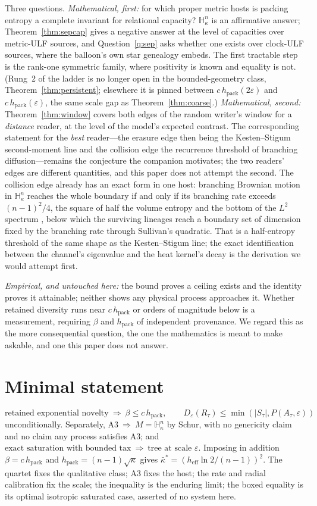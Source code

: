 \documentclass[11pt,reqno]{amsart}
\theoremstyle{plain}
\theoremstyle{definition}
\newcommand{\hpack}{h_{\mathrm{pack}}}
\newcommand{\heff}{h_{\mathrm{eff}}}
\newcommand{\Hk}{\mathbb{H}^n_\kappa}
\newcommand{\eps}{\varepsilon}
\begin{document}
Three questions. \emph{Mathematical, first:} for which proper metric hosts is packing entropy a complete invariant for relational capacity? $\Hk$ is an affirmative answer; Theorem~\ref{thm:sepcap} gives a negative answer at the level of capacities over metric-ULF sources, and Question~\ref{q:sep} asks whether one exists over clock-ULF sources, where the balloon's own star genealogy embeds. The first tractable step is the rank-one symmetric family, where positivity is known \cite{tessera2008,kerr2022} and equality is not. (Rung~2 of the ladder is no longer open in the bounded-geometry class, Theorem~\ref{thm:persistent}; elsewhere it is pinned between $c\,\hpack(2\eps)$ and $c\,\hpack(\eps)$, the same scale gap as Theorem~\ref{thm:coarse}.) \emph{Mathematical, second:} Theorem~\ref{thm:window} covers both edges of the random writer's window for a \emph{distance} reader, at the level of the model's expected contrast. The corresponding statement for the \emph{best} reader---the erasure edge then being the Kesten--Stigum second-moment line and the collision edge the recurrence threshold of branching diffusion---remains the conjecture the companion motivates; the two readers' edges are different quantities, and this paper does not attempt the second. The collision edge already has an exact form in one host: branching Brownian motion in $\Hk$ reaches the whole boundary if and only if its branching rate exceeds $(n-1)^2/4$, the square of half the volume entropy and the bottom of the $L^2$ spectrum \cite{lalleysellke1997,kps1998}, below which the surviving lineages reach a boundary set of dimension fixed by the branching rate through Sullivan's quadratic. That is a half-entropy threshold of the same shape as the Kesten--Stigum line; the exact identification between the channel's eigenvalue and the heat kernel's decay is the derivation we would attempt first.

\emph{Empirical, and untouched here:} the bound proves a ceiling exists and the identity proves it attainable; neither shows any physical process approaches it. Whether retained diversity runs near $c\,\hpack$ or orders of magnitude below is a measurement, requiring $\beta$ and $\hpack$ of independent provenance. We regard this as the more consequential question, the one the mathematics is meant to make askable, and one this paper does not answer.

\clearpage
\appendix
\section{Minimal statement}
\[
\boxed{\text{retained exponential novelty}\ \Longrightarrow\ \beta\le c\,\hpack,\qquad D_\eps(R_\tau)\le\min(|S_\tau|,P(A_\tau,\eps))}
\]
unconditionally. Separately, $\boxed{\text{A3}\ \Longrightarrow\ M=\Hk}$ by Schur, with no genericity claim and no claim any process satisfies A3; and $\boxed{\text{exact saturation with bounded tax}\ \Longrightarrow\ \text{tree at scale }\eps}$. Imposing in addition $\beta=c\,\hpack$ and $\hpack=(n-1)\sqrt\kappa$ gives $\bar\kappa^*=(\heff\ln2/(n-1))^2$. The quartet fixes the qualitative class; A3 fixes the host; the rate and radial calibration fix the scale; the inequality is the enduring limit; the boxed equality is its optimal isotropic saturated case, asserted of no system here.
\end{document}
